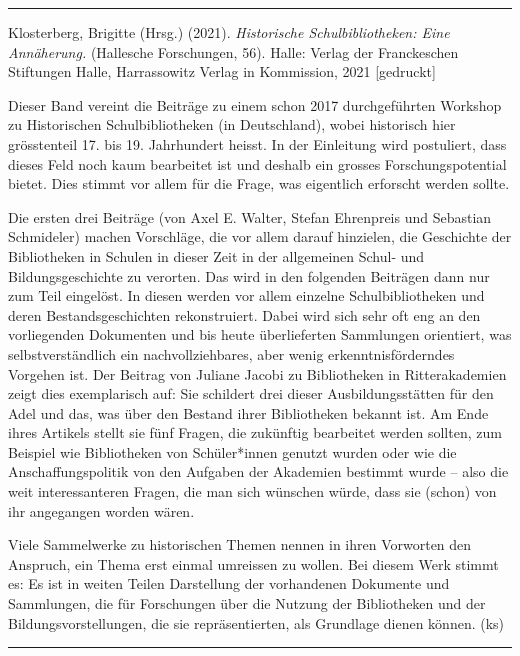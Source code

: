 \documentclass[a4paper,
fontsize=11pt,
oneside,
numbers=noperiodatend,
parskip=half-,
bibliography=totoc,
final
]{scrartcl}
\begin{document}
\begin{center}\rule{0.5\linewidth}{0.5pt}\end{center}

Klosterberg, Brigitte (Hrsg.) (2021). \emph{Historische
Schulbibliotheken: Eine Annäherung.} (Hallesche Forschungen, 56). Halle:
Verlag der Franckeschen Stiftungen Halle, Harrassowitz Verlag in
Kommission, 2021 {[}gedruckt{]}

Dieser Band vereint die Beiträge zu einem schon 2017 durchgeführten
Workshop zu Historischen Schulbibliotheken (in Deutschland), wobei
historisch hier grösstenteil 17. bis 19. Jahrhundert heisst. In der
Einleitung wird postuliert, dass dieses Feld noch kaum bearbeitet ist
und deshalb ein grosses Forschungspotential bietet. Dies stimmt vor
allem für die Frage, was eigentlich erforscht werden sollte.

Die ersten drei Beiträge (von Axel E. Walter, Stefan Ehrenpreis und
Sebastian Schmideler) machen Vorschläge, die vor allem darauf hinzielen,
die Geschichte der Bibliotheken in Schulen in dieser Zeit in der
allgemeinen Schul- und Bildungsgeschichte zu verorten. Das wird in den
folgenden Beiträgen dann nur zum Teil eingelöst. In diesen werden vor
allem einzelne Schulbibliotheken und deren Bestandsgeschichten
rekonstruiert. Dabei wird sich sehr oft eng an den vorliegenden
Dokumenten und bis heute überlieferten Sammlungen orientiert, was
selbstverständlich ein nachvollziehbares, aber wenig
erkenntnisförderndes Vorgehen ist. Der Beitrag von Juliane Jacobi zu
Bibliotheken in Ritterakademien zeigt dies exemplarisch auf: Sie
schildert drei dieser Ausbildungsstätten für den Adel und das, was über
den Bestand ihrer Bibliotheken bekannt ist. Am Ende ihres Artikels
stellt sie fünf Fragen, die zukünftig bearbeitet werden sollten, zum
Beispiel wie Bibliotheken von Schüler*innen genutzt wurden oder wie die
Anschaffungspolitik von den Aufgaben der Akademien bestimmt wurde --
also die weit interessanteren Fragen, die man sich wünschen würde, dass
sie (schon) von ihr angegangen worden wären.

Viele Sammelwerke zu historischen Themen nennen in ihren Vorworten den
Anspruch, ein Thema erst einmal umreissen zu wollen. Bei diesem Werk
stimmt es: Es ist in weiten Teilen Darstellung der vorhandenen Dokumente
und Sammlungen, die für Forschungen über die Nutzung der Bibliotheken
und der Bildungsvorstellungen, die sie repräsentierten, als Grundlage
dienen können. (ks)

\begin{center}\rule{0.5\linewidth}{0.5pt}\end{center}
\end{document}
